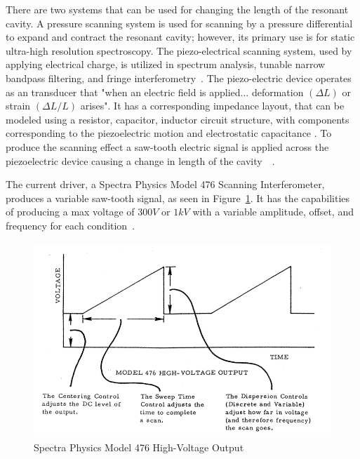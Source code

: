\documentclass[12pt]{report}
\begin{document}
\noindent There are two systems that can be used for changing the length of the resonant cavity. A pressure scanning system is used for scanning by a pressure differential to expand and contract the resonant cavity; however, its primary use is for static ultra-high resolution spectroscopy. The piezo-electrical scanning system, used by applying electrical charge, is utilized in spectrum analysis, tunable narrow bandpass filtering, and fringe interferometry~\cite{hercher}. The piezo-electric device operates as an transducer that "when an electric field is applied... deformation $(\Delta L)$ or strain $(\Delta L/L)$ arises". It has a corresponding impedance layout, that can be modeled using a resistor, capacitor, inductor circuit structure, with components corresponding to the piezoelectric motion and electrostatic capacitance \cite{piezo}. To produce the scanning effect a saw-tooth electric signal is applied across the piezoelectric device causing a change in length of the cavity~\cite{piezo}~\cite{hercher}.\newline


The current driver, a Spectra Physics Model 476 Scanning Interferometer, produces a variable saw-tooth signal, as seen in Figure~\ref{fig:outputramp}. It has the capabilities of producing a max voltage of $300 V$ or $1 kV$ with a variable amplitude, offset, and frequency for each condition~\cite{sfpidriver}.  

\begin{figure}[h!]
	\centering
	\includegraphics[width=6in]{driver.png}
	\caption[Spectra Physics Model 476 High-Voltage Output]{Spectra Physics Model 476 High-Voltage Output~\cite{sfpidriver}}
	\label{fig:outputramp}
\end{figure}
\end{document}
